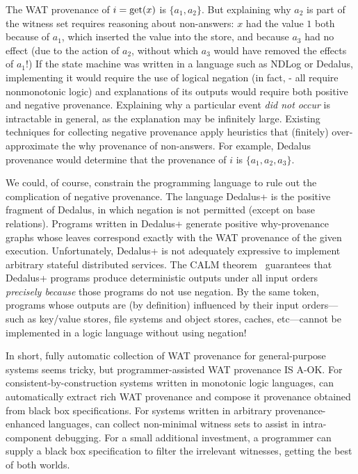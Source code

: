 The WAT provenance of $i = \text{get}(x)$ is $\{a_1, a_2\}$.  But explaining why
$a_2$ is part of the witness set requires reasoning about non-answers: $x$ had
the value $1$ both because of $a_1$, which inserted the value into the store,
and because $a_3$ had no effect (due to the action of $a_2$, without which
$a_3$ would have removed the effects of $a_1$!) If the state machine was
written in a language such as NDLog or Dedalus, implementing it would require
the use of logical negation (in fact,
- all require
nonmonotonic logic) and explanations of its outputs would require both positive
and negative provenance.  Explaining why a particular event \emph{did not
occur} is intractable in general, as the explanation may be infinitely large.
Existing techniques for collecting negative provenance apply heuristics that
(finitely) over-approximate the why provenance of non-answers.  For example,
Dedalus provenance would determine that the provenance of $i$ is $\{a_1, a_2,
a_3\}$.

We could, of course, constrain the programming language to rule out the
complication of negative provenance.  The language
Dedalus+\cite{marczak2012confluence} is the positive fragment of Dedalus, in
which negation is not permitted (except on base relations).    Programs written
in Dedalus+ generate positive why-provenance graphs whose leaves correspond
exactly with the WAT provenance of the given execution. Unfortunately, Dedalus+
is not adequately expressive to implement arbitrary stateful distributed
services.  The CALM theorem~\cite{alvaro2011consistency,ameloot2013transducers}
guarantees that Dedalus+ programs produce deterministic outputs under all input
orders \emph{precisely because} those programs do not use negation.  By the
same token, programs whose outputs are (by definition) influenced by their
input orders---such as key/value stores, file systems and object stores,
caches, etc---cannot be implemented in a logic language without using negation!

In short, fully automatic collection of WAT provenance for general-purpose
systems seems tricky, but programmer-assisted WAT provenance IS A-OK.  For
consistent-by-construction systems written in monotonic logic languages,
\fluent{} can automatically extract rich WAT provenance and compose it
provenance obtained from black box specifications.  For systems written in
arbitrary provenance-enhanced languages, \fluent{} can collect non-minimal
witness sets to assist in intra-component debugging.  For a small additional
investment, a programmer can supply a black box specification to filter the
irrelevant witnesses, getting the best of both worlds.

